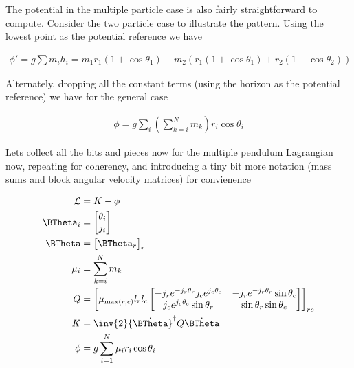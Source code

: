 The potential in the multiple particle case is also fairly straightforward to compute.  Consider the two particle case to illustrate the pattern.   Using the lowest point as the potential reference we have

\begin{align}\label{eqn:sPolarMultiPendulum:zoo18}
\phi' = g \sum m_i h_i
= m_1 r_1 (1 + \cos\theta_1) 
+ m_2 \left( r_1(1 + \cos\theta_1) + r_2( 1 + \cos\theta_2) \right)
\end{align}

Alternately, dropping all the constant terms (using the horizon as the potential reference) we have for the general case

\begin{align}\label{eqn:sPolarMultiPendulum:zoo19}
\phi = g \sum_i \left( \sum_{k=i}^N m_k \right) r_i \cos\theta_i
\end{align}

Lets collect all the bits and pieces now for the multiple pendulum Lagrangian now, repeating for coherency, and introducing a tiny bit more notation (mass sums and block angular velocity matrices) for convienence

\begin{align}\label{eqn:sPolarMultiPendulum:zoo20}
\LL &= K - \phi \\
\BTheta_i &=
\begin{bmatrix}
\theta_i \\
j_i
\end{bmatrix} \\
\BTheta &=
{\begin{bmatrix}
\BTheta_r
\end{bmatrix}}_{r} \\
\mu_i &=
\sum_{k=i}^N m_k \\
Q &=
{\begin{bmatrix}
\mu_{\max(r,c)}
l_r l_c
\begin{bmatrix}
- j_r e^{-j_r \theta_r} j_c e^{j_c\theta_c} & - j_r e^{-j_r \theta_r} \sin\theta_c \\
j_c e^{j_c \theta_c} \sin\theta_r & \sin\theta_r \sin\theta_c
\end{bmatrix}
\end{bmatrix}}_{rc} \\
K &=
\inv{2} {\dot{\BTheta}}^\dagger Q \dot{\BTheta} \\
\phi &=
g \sum_{i=1}^N \mu_i r_i \cos\theta_i
\end{align}

